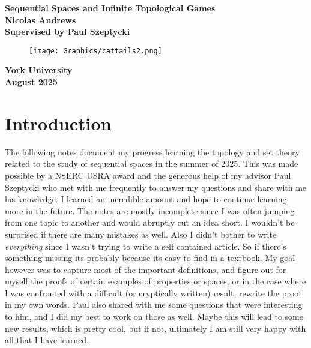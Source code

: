 \documentclass{article}
\begin{document}
\begin{titlepage}
    \centering
    \vfill
    \vfill
    \vfill
    {\bfseries \LARGE
        Sequential Spaces and Infinite Topological Games 
    } 
    \\
    \vspace*{1cm}
    {\large \bfseries  Nicolas Andrews \\ Supervised by Paul Szeptycki 
    }   
    \vfill
    \vfill
    \vfill
    \vfill
    \begin{figure}[h]
        \centering
        \texttt{[image: Graphics/cattails2.png]}
    \end{figure}
    \vfill
    {\large \bfseries  York University  \\ August 2025
    }
    \vfill
    \vfill
\end{titlepage}




\tableofcontents




\newpage
\section{Introduction}

The following notes document my progress learning the topology and set theory related to the study of sequential spaces in the summer of 2025. This was made possible by a NSERC USRA award and the generous help of my advisor Paul Szeptycki who met with me frequently to answer my questions and share with me his knowledge. I learned an incredible amount and hope to continue learning more in the future. The notes are mostly incomplete since I was often jumping from one topic to another and would abruptly cut an idea short. I wouldn't be surprised if there are many mistakes as well. Also I didn't bother to write \textit{everything} since I wasn't trying to write a self contained article. So if there's something missing its probably because its easy to find in a textbook.  My goal however was to capture most of the important definitions, and figure out for myself the proofs of certain examples of properties or spaces, or in the case where I was confronted with a difficult (or cryptically written) result, rewrite the proof in my own words. Paul also shared with me some questions that were interesting to him, and I did my best to work on those as well. Maybe this will lead to some new results, which is pretty cool, but if not, ultimately I am still very happy with all that I have learned. 
\end{document}
